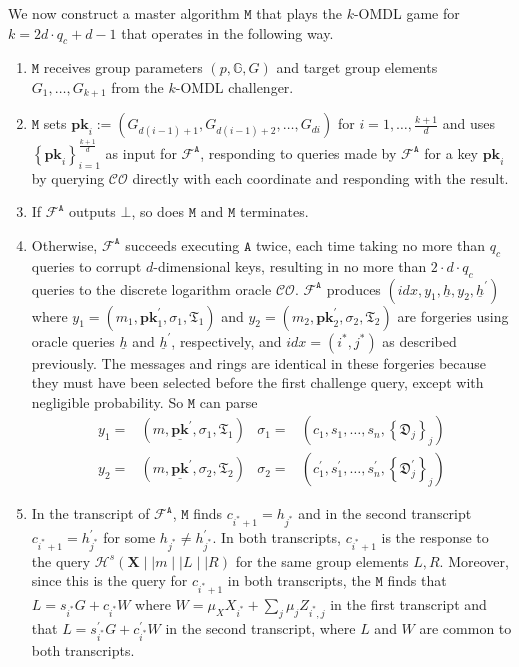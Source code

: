 \documentclass{mrl}
\theoremstyle{plain}
\theoremstyle{definition}
\begin{document}
We now construct a master algorithm $\texttt{M}$ that plays the $k$-OMDL game for $k=2d\cdot q_c + d-1$ that operates in the following way.
\begin{enumerate}

\item $\texttt{M}$ receives group parameters $(p, \mathbb{G}, G)$ and target group elements $G_1, \ldots, G_{k+1}$ from the $k$-OMDL challenger.

\item $\texttt{M}$ sets $\textbf{pk}_i := (G_{d(i-1) + 1}, G_{d(i-1) + 2}, \ldots, G_{di})$ for $i=1, \ldots, \frac{k+1}{d}$ and uses $\left\{\textbf{pk}_i\right\}_{i=1}^{\frac{k+1}{d}}$ as input for $\mathcal{F}^{\texttt{A}}$, responding to queries made by $\mathcal{F}^{\texttt{A}}$ for a key $\textbf{pk}_i$ by querying $\mathcal{CO}$ directly with each coordinate and responding with the result.

\item If $\mathcal{F}^{\texttt{A}}$ outputs $\bot$, so does $\texttt{M}$ and $\texttt{M}$ terminates.

\item Otherwise, $\mathcal{F}^{\texttt{A}}$ succeeds executing $\texttt{A}$ twice, each time taking no more than $q_c$ queries to corrupt $d$-dimensional keys, resulting in no more than $2\cdot d\cdot q_c$ queries to the discrete logarithm oracle $\mathcal{CO}$. $\mathcal{F}^{\texttt{A}}$ produces $(\textit{idx}, y_1, \underline{h}, y_2, \underline{h}^\prime)$ where $y_1 = (m_1, \textbf{pk}^{\prime}_1, \sigma_1, \mathfrak{T}_1)$ and $y_2 = (m_2, \textbf{pk}^{\prime}_2, \sigma_2, \mathfrak{T}_2)$ are forgeries using oracle queries $\underline{h}$ and $\underline{h}^\prime$, respectively, and $\textit{idx} = (i^*, j^*)$ as described previously. The messages and rings are identical in these forgeries because they must have been selected before the first challenge query, except with negligible probability. So $\texttt{M}$ can parse 
\begin{align*}
y_1 =& (m, \underline{\textbf{pk}}^\prime, \sigma_1, \mathfrak{T}_1) & \sigma_1 =& (c_1, s_1, \ldots, s_n, \left\{\mathfrak{D}_j\right\}_j) \\
y_2 =& (m, \underline{\textbf{pk}}^\prime, \sigma_2, \mathfrak{T}_2) & \sigma_2 =& (c_1^\prime, s_1^\prime, \ldots, s_n^\prime, \left\{\mathfrak{D}_j^\prime\right\}_j)\end{align*}


\item In the transcript of $\mathcal{F}^{\texttt{A}}$, $\texttt{M}$ finds $c_{i^*+1} = h_{j^*}$ and in the second transcript $c_{i^*+1} = h^\prime_{j^*}$ for some $h_{j^*} \neq h^\prime_{j^*}$. In both transcripts, $c_{i^*+1}$ is the response to the query $\mathcal{H}^s(\textbf{X} \mid \mid m \mid \mid L \mid \mid R)$ for the same group elements $L, R$. Moreover, since this is the query for $c_{i^*+1}$ in both transcripts, the  $\texttt{M}$ finds that $L = s_{i^*} G + c_{i^*} W$ where $W = \mu_X X_{i^*} + \sum_j \mu_j Z_{i^*, j}$ in the first transcript and that $L = s_{i^*}^\prime G + c_{i^*}^\prime W$ in the second transcript, where $L$ and $W$ are common to both transcripts.


\end{enumerate}
\end{document}
